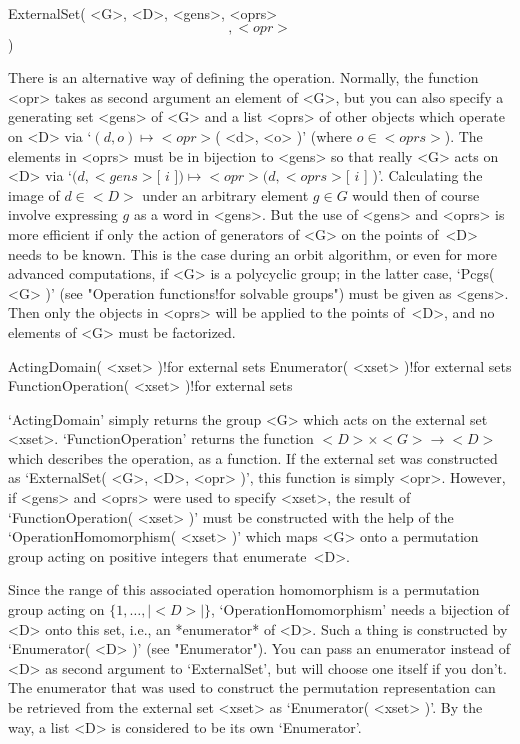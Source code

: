 \)ExternalSet( <G>, <D>, <gens>, <oprs> \[, <opr> \] )

There is  an  alternative way of  defining  the operation.  Normally, the
{\GAP} function <opr> takes as second argument an element of <G>, but you
can also specify  a  generating set <gens> of   <G> and a list <oprs>  of
other {\GAP}  objects which operate  on  <D> via `$(d,o)  \mapsto <opr>$(
<d>, <o> )'  (where  $o\in <oprs>$). The elements   in <oprs> must be  in
bijection to <gens> so that really <G> acts  on <D> via `$(d,<gens>$[ $i$
]$) \mapsto <opr>( d, <oprs>$[  $i$ ] )'.  Calculating the image of $d\in
<D>$ under  an arbitrary element  $g\in  G$ would then  of course involve
expressing $g$ as a word in  <gens>. But the  use of <gens> and <oprs> is
more  efficient if only the  action  of generators of   <G> on the points
of~<D> needs to be known. This is the case  during an orbit algorithm, or
even for more advanced computations, if <G> is a polycyclic group; in the
latter case,  `Pcgs(    <G> )'  (see  "Operation  functions!for  solvable
groups") must be given as <gens>. Then only the objects in <oprs> will be
applied to the points of~<D>, and no elements of <G> must be factorized.

\>ActingDomain( <xset> )!{for external sets}
\>Enumerator( <xset> )!{for external sets}
\>FunctionOperation( <xset> )!{for external sets}

`ActingDomain' simply  returns the group  <G> which acts on  the external
set <xset>. `FunctionOperation' returns the  function $<D>\times <G>  \to
<D>$ which describes the operation, as a {\GAP} function. If the external
set was constructed as `ExternalSet( <G>, <D>, <opr> )', this function is
simply <opr>. However, if <gens> and <oprs>  were used to specify <xset>,
the result of `FunctionOperation( <xset>  )' must be constructed with the
help  of the  `OperationHomomorphism(  <xset> )'  which maps  <G>  onto a
permutation group acting on positive integers that enumerate~<D>.

Since  the  range  of  this  associated    operation homomorphism is    a
permutation group acting on $\{1,\ldots,|<D>|\}$, `OperationHomomorphism'
needs a bijection of  <D> onto this  set,  i.e., an *enumerator* of  <D>.
Such a  thing is constructed by `Enumerator(  <D>  )' (see "Enumerator").
You  can  pass  an  enumerator  instead  of  <D>  as  second  argument to
`ExternalSet', but  {\GAP} will choose   one  itself if you  don't.   The
enumerator that was used to construct  the permutation representation can
be retrieved from the  external set <xset> as  `Enumerator( <xset> )'. By
the way, a list <D> is considered to be its own `Enumerator'.

